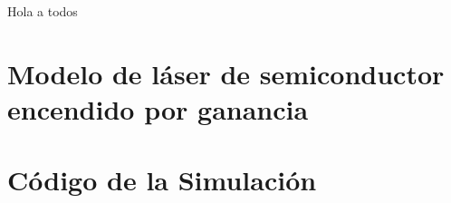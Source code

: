 Hola a todos

	\section{Modelo de l\'aser de semiconductor encendido por ganancia}
		\label{Mdl:RoF}
	
		

	\section{Código de la Simulación}
		\label{Mdl:Code}
	
		
	
